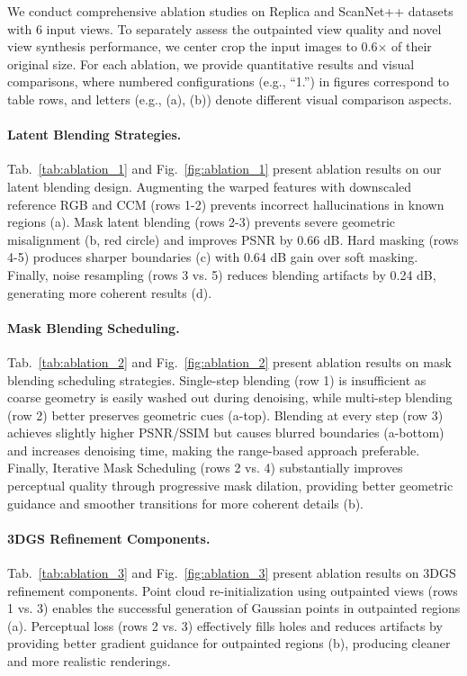 \documentclass[runningheads]{llncs}
\begin{document}
\label{sec:ablation}
We conduct comprehensive ablation studies on Replica and ScanNet++ datasets with 6 input views. To separately assess the outpainted view quality and novel view synthesis performance, we center crop the input images to 0.6× of their original size. For each ablation, we provide quantitative results and visual comparisons, where numbered configurations (e.g., ``1.'') in figures correspond to table rows, and letters (e.g., (a), (b)) denote different visual comparison aspects.

\paragraph{Latent Blending Strategies.}
Tab.~\ref{tab:ablation_1} and Fig.~\ref{fig:ablation_1} present ablation results on our latent blending design. Augmenting the warped features with downscaled reference RGB and CCM (rows 1-2) prevents incorrect hallucinations in known regions (a). Mask latent blending (rows 2-3) prevents severe geometric misalignment (b, red circle) and improves PSNR by 0.66 dB. Hard masking (rows 4-5) produces sharper boundaries (c) with 0.64 dB gain over soft masking. Finally, noise resampling (rows 3 vs. 5) reduces blending artifacts by 0.24 dB, generating more coherent results (d).

\paragraph{Mask Blending Scheduling.}
Tab.~\ref{tab:ablation_2} and Fig.~\ref{fig:ablation_2} present ablation results on mask blending scheduling strategies. Single-step blending (row 1) is insufficient as coarse geometry is easily washed out during denoising, while multi-step blending (row 2) better preserves geometric cues (a-top). Blending at every step (row 3) achieves slightly higher PSNR/SSIM but causes blurred boundaries (a-bottom) and increases denoising time, making the range-based approach preferable. Finally, Iterative Mask Scheduling (rows 2 vs. 4) substantially improves perceptual quality through progressive mask dilation, providing better geometric guidance and smoother transitions for more coherent details (b).

\paragraph{3DGS Refinement Components.}
Tab.~\ref{tab:ablation_3} and Fig.~\ref{fig:ablation_3} present ablation results on 3DGS refinement components. Point cloud re-initialization using outpainted views (rows 1 vs. 3) enables the successful generation of Gaussian points in outpainted regions (a). Perceptual loss (rows 2 vs. 3) effectively fills holes and reduces artifacts by providing better gradient guidance for outpainted regions (b), producing cleaner and more realistic renderings.
\end{document}
